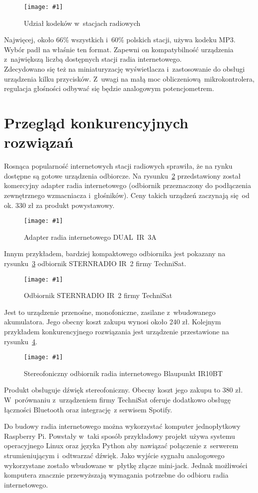 \documentclass[polish]{aghengthesis}
\newcommand{\imgint}[4]{
	\begin{figure}[{#4}]
		\centering
		\texttt{[image: \#1]}
		\caption{#2}
		\label{#1}
	\end{figure}
}
\newcommand{\imgh}[3]{\imgint{#1}{#2}{#3}{H}}
\begin{document}
			\imgh{3/rb_chart_new}{Udział kodeków w~stacjach radiowych}{0.8}
			
			Najwięcej, około 66\% wszystkich i~60\% polskich stacji, używa kodeku MP3. Wybór padł na właśnie ten format.
			Zapewni on kompatybilność urządzenia z~największą liczbą dostępnych stacji radia internetowego.
			$ $\\
			
			Zdecydowano się też na miniaturyzację wyświetlacza i~zastosowanie do obsługi urządzenia kilku przycisków. Z~uwagi na małą moc obliczeniową mikrokontrolera, regulacja głośności odbywać się będzie analogowym potencjometrem.
		
	\section{Przegląd konkurencyjnych rozwiązań}
		Rosnąca popularność internetowych stacji radiowych sprawiła, że na rynku dostępne są gotowe urządzenia odbiorcze.
		Na rysunku~\ref{1/radio_adapter} przedstawiony został komercyjny adapter radia internetowego (odbiornik przeznaczony do podłączenia zewnętrznego wzmacniacza i~głośników). Ceny takich urządzeń zaczynają się od ok. 330 zł za produkt powystawowy. 
		\imgh{1/radio_adapter}{Adapter radia internetowego DUAL~IR~3A\textsuperscript{\cite{radio_adapter}}}{0.7}
		
		Innym przykładem, bardziej kompaktowego odbiornika jest pokazany na rysunku~\ref{1/radio_tanie} odbiornik STERNRADIO IR~2 firmy TechniSat.
		\imgh{1/radio_tanie}{Odbiornik STERNRADIO IR~2 firmy TechniSat\textsuperscript{\cite{radio_tanie}}}{0.7}
		Jest to urządzenie przenośne, monofoniczne, zasilane z~wbudowanego akumulatora. Jego obecny koszt zakupu wynosi około 240 zł.
		Kolejnym przykładem konkurencyjnego rozwiązania jest urządzenie przestawione na rysunku~\ref{1/radio_drogie}.
		\imgh{1/radio_drogie}{Stereofoniczny odbiornik radia internetowego Blaupunkt IR10BT\textsuperscript{\cite{radio_drogie}}}{0.7}
		Produkt obsługuje dźwięk stereofoniczny. Obecny koszt jego zakupu to 380 zł. W~porównaniu z~urządzeniem firmy TechniSat oferuje dodatkowo obsługę łączności Bluetooth oraz integrację z serwisem Spotify.
		
		Do budowy radia internetowego można wykorzystać komputer jednopłytkowy Raspberry Pi. Powstały w~taki sposób przykładowy projekt\textsuperscript{\cite{rpi_sbc_radio}} używa systemu operacyjnego Linux oraz języka Python aby nawiązać połączenie z~serwerem strumieniującym i~odtwarzać dźwięk. Jako wyjście sygnału analogowego wykorzystane zostało wbudowane w~płytkę złącze mini-jack.
		Jednak możliwości komputera znacznie przewyższają wymagania potrzebne do odbioru radia internetowego.
		$ $\\
		
\end{document}

